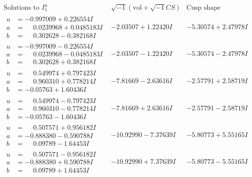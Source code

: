 \documentclass[1p]{elsarticle_modified}
\theoremstyle{definition}
\newcommand{\I}{\sqrt{-1}}
\begin{document}
$$\begin{array}{c|c|c}  
\text{Solutions to }I^u_{1}& \I (\text{vol} + \sqrt{-1}CS) & \text{Cusp shape}\\
 \hline 
\begin{aligned}
u &= -0.997009 + 0.226554 I \\
a &= \phantom{-}0.0239968 + 0.0485183 I \\
b &= \phantom{-}0.302628 - 0.382168 I\end{aligned}
 & -2.03507 + 1.22420 I & -5.30574 + 2.47978 I \\ \hline\begin{aligned}
u &= -0.997009 - 0.226554 I \\
a &= \phantom{-}0.0239968 - 0.0485183 I \\
b &= \phantom{-}0.302628 + 0.382168 I\end{aligned}
 & -2.03507 - 1.22420 I & -5.30574 - 2.47978 I \\ \hline\begin{aligned}
u &= \phantom{-}0.549974 + 0.797423 I \\
a &= \phantom{-}0.960310 + 0.778214 I \\
b &= -0.05763 + 1.60436 I\end{aligned}
 & -7.81669 - 2.63616 I & -2.57791 + 2.58719 I \\ \hline\begin{aligned}
u &= \phantom{-}0.549974 - 0.797423 I \\
a &= \phantom{-}0.960310 - 0.778214 I \\
b &= -0.05763 - 1.60436 I\end{aligned}
 & -7.81669 + 2.63616 I & -2.57791 - 2.58719 I \\ \hline\begin{aligned}
u &= \phantom{-}0.507571 + 0.956182 I \\
a &= -0.888380 - 0.590788 I \\
b &= \phantom{-}0.09789 - 1.64453 I\end{aligned}
 & -10.92990 - 7.37639 I & -5.80773 + 5.55165 I \\ \hline\begin{aligned}
u &= \phantom{-}0.507571 - 0.956182 I \\
a &= -0.888380 + 0.590788 I \\
b &= \phantom{-}0.09789 + 1.64453 I\end{aligned}
 & -10.92990 + 7.37639 I & -5.80773 - 5.55165 I \\ \hline\begin{aligned}

\end{aligned}
\end{array}$$
\end{document}
